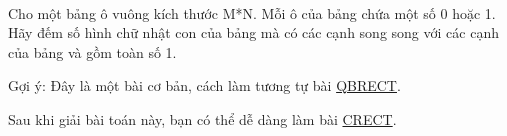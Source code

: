  

Cho một bảng ô vuông kích thước M*N. Mỗi ô của bảng chứa một số 0 hoặc 1. Hãy đếm số hình chữ nhật con của bảng mà có các cạnh song song với các cạnh của bảng và gồm toàn số 1.

Gợi ý: Đây là một bài cơ bản, cách làm tương tự bài \href{http://vnoi.info/problems/show/QBRECT/}{ QBRECT}.

Sau khi giải bài toán này, bạn có thể dễ dàng làm bài \href{http://vnoi.info/problems/show/CRECT/}{ CRECT}.

\